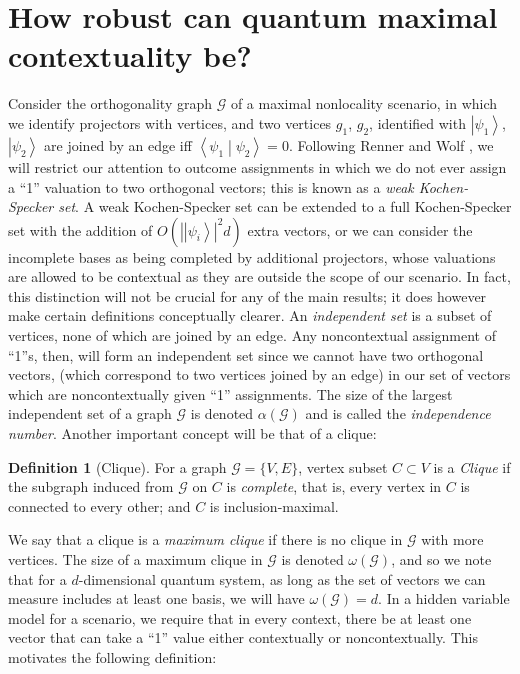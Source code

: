\documentclass{amsart}
\theoremstyle{definition}
\newtheorem{defn}{Definition}
\newcommand{\ket}[1]{{\left\vert{#1}\right\rangle}}
\newcommand{\braket}[2]{{\left< {#1} \middle\vert {#2}\right>}}
\begin{document}


\section{How robust can quantum maximal contextuality be?}\label{sec:main}

Consider the orthogonality graph $\mathcal{G}$ of a maximal nonlocality scenario, in which we identify projectors with vertices, and two vertices $g_1$, $g_2$, identified with $\ket{\psi_1}$, $\ket{\psi_2}$ are joined by an edge iff $\braket{\psi_1}{\psi_2}=0$. Following Renner and Wolf \cite{Renn2004}, we will restrict our attention to outcome assignments in which we do not ever assign a ``1'' valuation to two orthogonal vectors; this is known as a \emph{weak Kochen-Specker set}. A weak Kochen-Specker set can be extended to a full Kochen-Specker set with the addition of $O(|\ket{\psi_i}|^2d)$ extra vectors, or we can consider the incomplete bases as being completed by additional projectors, whose valuations are allowed to be contextual as they are outside the scope of our scenario. In fact, this distinction will not be crucial for any of the main results; it does however make certain definitions conceptually clearer. An \emph{independent set} is a subset of vertices, none of which are joined by an edge. Any noncontextual assignment of ``1''s, then, will form an independent set since we cannot have two orthogonal vectors, (which correspond to two vertices joined by an edge) in our set of vectors which are noncontextually given ``1'' assignments. The size of the largest independent set of a graph $\mathcal{G}$ is denoted $\alpha(\mathcal{G})$ and is called the \emph{independence number}. Another important concept will be that of a clique:%

\begin{defn}[Clique]
For a graph $\mathcal{G}=\{V,E\}$, vertex subset $C\subset V$ is a \emph{Clique} if the subgraph induced from $\mathcal{G}$ on $C$ is \emph{complete}, that is, every vertex in $C$ is connected to every other; and $C$ is inclusion-maximal.
\end{defn}

We say that a clique is a \emph{maximum clique} if there is no clique in $\mathcal{G}$ with more vertices. The size of a maximum clique in $\mathcal{G}$ is denoted $\omega(\mathcal{G})$, and so we note that for a $d$-dimensional quantum system, as long as the set of vectors we can measure includes at least one basis, we will have $\omega(\mathcal{G})=d$. In a hidden variable model for a scenario, we require that in every context, there be at least one vector that can take a ``1'' value either contextually or noncontextually. This motivates the following definition:
\end{document}
